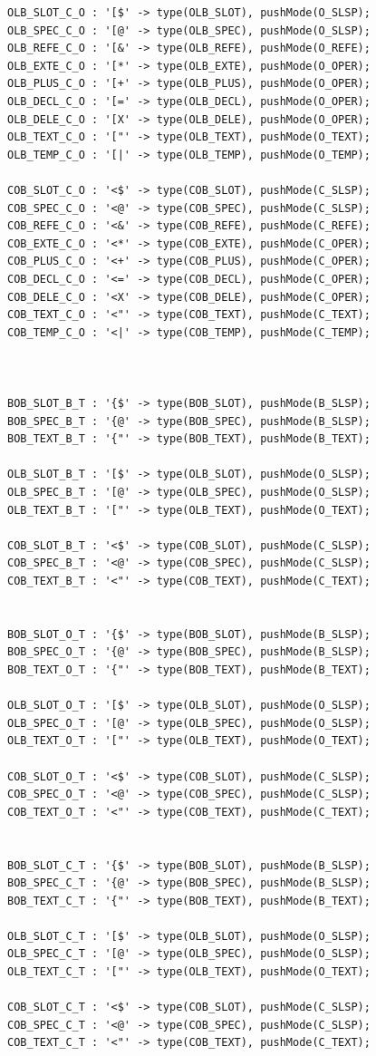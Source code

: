 \begin{verbatim}
OLB_SLOT_C_O : '[$' -> type(OLB_SLOT), pushMode(O_SLSP);
OLB_SPEC_C_O : '[@' -> type(OLB_SPEC), pushMode(O_SLSP);
OLB_REFE_C_O : '[&' -> type(OLB_REFE), pushMode(O_REFE);
OLB_EXTE_C_O : '[*' -> type(OLB_EXTE), pushMode(O_OPER);
OLB_PLUS_C_O : '[+' -> type(OLB_PLUS), pushMode(O_OPER);
OLB_DECL_C_O : '[=' -> type(OLB_DECL), pushMode(O_OPER);
OLB_DELE_C_O : '[X' -> type(OLB_DELE), pushMode(O_OPER);
OLB_TEXT_C_O : '["' -> type(OLB_TEXT), pushMode(O_TEXT);
OLB_TEMP_C_O : '[|' -> type(OLB_TEMP), pushMode(O_TEMP);

COB_SLOT_C_O : '<$' -> type(COB_SLOT), pushMode(C_SLSP);
COB_SPEC_C_O : '<@' -> type(COB_SPEC), pushMode(C_SLSP);
COB_REFE_C_O : '<&' -> type(COB_REFE), pushMode(C_REFE);
COB_EXTE_C_O : '<*' -> type(COB_EXTE), pushMode(C_OPER);
COB_PLUS_C_O : '<+' -> type(COB_PLUS), pushMode(C_OPER);
COB_DECL_C_O : '<=' -> type(COB_DECL), pushMode(C_OPER);
COB_DELE_C_O : '<X' -> type(COB_DELE), pushMode(C_OPER);
COB_TEXT_C_O : '<"' -> type(COB_TEXT), pushMode(C_TEXT);
COB_TEMP_C_O : '<|' -> type(COB_TEMP), pushMode(C_TEMP);



BOB_SLOT_B_T : '{$' -> type(BOB_SLOT), pushMode(B_SLSP);
BOB_SPEC_B_T : '{@' -> type(BOB_SPEC), pushMode(B_SLSP);
BOB_TEXT_B_T : '{"' -> type(BOB_TEXT), pushMode(B_TEXT);

OLB_SLOT_B_T : '[$' -> type(OLB_SLOT), pushMode(O_SLSP);
OLB_SPEC_B_T : '[@' -> type(OLB_SPEC), pushMode(O_SLSP);
OLB_TEXT_B_T : '["' -> type(OLB_TEXT), pushMode(O_TEXT);

COB_SLOT_B_T : '<$' -> type(COB_SLOT), pushMode(C_SLSP);
COB_SPEC_B_T : '<@' -> type(COB_SPEC), pushMode(C_SLSP);
COB_TEXT_B_T : '<"' -> type(COB_TEXT), pushMode(C_TEXT);


BOB_SLOT_O_T : '{$' -> type(BOB_SLOT), pushMode(B_SLSP);
BOB_SPEC_O_T : '{@' -> type(BOB_SPEC), pushMode(B_SLSP);
BOB_TEXT_O_T : '{"' -> type(BOB_TEXT), pushMode(B_TEXT);

OLB_SLOT_O_T : '[$' -> type(OLB_SLOT), pushMode(O_SLSP);
OLB_SPEC_O_T : '[@' -> type(OLB_SPEC), pushMode(O_SLSP);
OLB_TEXT_O_T : '["' -> type(OLB_TEXT), pushMode(O_TEXT);

COB_SLOT_O_T : '<$' -> type(COB_SLOT), pushMode(C_SLSP);
COB_SPEC_O_T : '<@' -> type(COB_SPEC), pushMode(C_SLSP);
COB_TEXT_O_T : '<"' -> type(COB_TEXT), pushMode(C_TEXT);


BOB_SLOT_C_T : '{$' -> type(BOB_SLOT), pushMode(B_SLSP);
BOB_SPEC_C_T : '{@' -> type(BOB_SPEC), pushMode(B_SLSP);
BOB_TEXT_C_T : '{"' -> type(BOB_TEXT), pushMode(B_TEXT);

OLB_SLOT_C_T : '[$' -> type(OLB_SLOT), pushMode(O_SLSP);
OLB_SPEC_C_T : '[@' -> type(OLB_SPEC), pushMode(O_SLSP);
OLB_TEXT_C_T : '["' -> type(OLB_TEXT), pushMode(O_TEXT);

COB_SLOT_C_T : '<$' -> type(COB_SLOT), pushMode(C_SLSP);
COB_SPEC_C_T : '<@' -> type(COB_SPEC), pushMode(C_SLSP);
COB_TEXT_C_T : '<"' -> type(COB_TEXT), pushMode(C_TEXT);

\end{verbatim}

